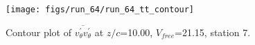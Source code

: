 \begin{figure}[H]
\centering
\texttt{[image: figs/run\_64/run\_64\_tt\_contour]}
\caption{Contour plot of $\overline{v_{\theta}^{\prime} v_{\theta}^{\prime}}$ at $z/c$=10.00, $V_{free}$=21.15, station 7.}
\label{fig:run_64_tt_contour}
\end{figure}


